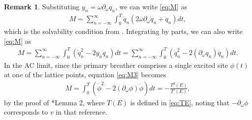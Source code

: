 \documentclass[12pt,reqno]{amsart}
\theoremstyle{definition}
\newtheorem{remark}{Remark}
\begin{document}
\begin{remark}\label{remark:solvability}
Substituting $y_n = \omega \partial_\omega q_n$, we can write \cref{eq:M} as 
\begin{align}\label{eq:M2}
M =
\sum_{n = -\infty}^\infty \int_0^T \dot{q}_n \left( 2 \omega \partial_\omega \dot{q}_n + \dot{q}_n \right) dt,
\end{align}
which is the solvability condition from \cite{kevrekidis2016}. Integrating by parts, we can also write \cref{eq:M} as 
\begin{align}\label{eq:M3}
M =
\sum_{n = -\infty}^\infty \int_0^T \left( \dot{q}_n^2 - 2 y_n \ddot{q}_n \right) dt =
\sum_{n = -\infty}^\infty \int_0^T \left( \dot{q}_n^2 - 2 (\partial_\omega q_n) \ddot{q}_n \right) dt.
\end{align}
In the AC limit, since the primary breather comprises a single excited site $\phi(t)$ at one of the lattice points, equation \cref{eq:M3} becomes
\begin{align}\label{eq:MAC}
M = \int_0^T \left( \dot{\phi}^2 - 2 (\partial_\omega \phi) \ddot{\phi} \right) dt = - \frac{T^2(E)}{T'(E)},
\end{align}
by the proof of \cite{Pelinovsky2012}*{Lemma 2}, where $T(E)$ is defined in \cref{eq:TE}, noting that $-\partial_\omega \phi$ corresponds to $v$ in that reference.
\end{remark}
\end{document}
